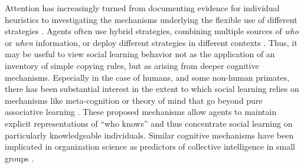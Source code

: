 \documentclass[12pt,letterpaper]{article}
\begin{document}
Attention has increasingly turned from documenting evidence for individual heuristics to investigating the mechanisms underlying the flexible use of different strategies \cite{heyes2016blackboxing,kendal2018social}. 
Agents often use hybrid strategies, combining multiple sources of \emph{who} or \emph{when} information, or deploy different strategies in different contexts \cite{mcelreath_beyond_2008}.
Thus, it may be useful to view social learning behavior not as the application of an inventory of simple copying rules, but as arising from deeper cognitive mechanisms.
Especially in the case of humans, and some non-human primates, there has been substantial interest in the extent to which social learning relies on mechanisms like meta-cognition \cite{heyes2016knows} or theory of mind \cite{shafto2012learning} that go beyond pure associative learning \cite{behrens2008associative,heyes_whats_2012,heyes2012simple}.
These proposed mechanisms allow agents to maintain explicit representations of ``who knows'' and thus concentrate social learning on particularly knowledgeable individuals.
Similar cognitive mechanisms have been implicated in organization science as predictors of collective intelligence in small groups \cite{woolley2010evidence,engel2014reading}.
\end{document}
